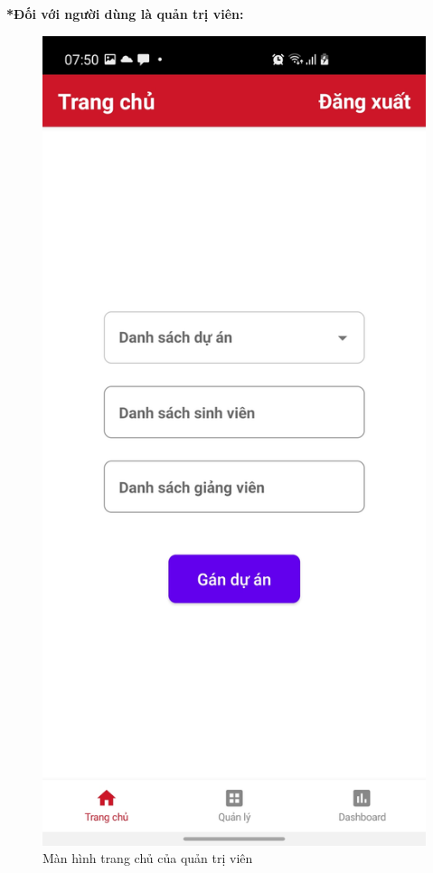 \documentclass[../Main.tex]{subfiles}
\begin{document}
\textbf{*Đối với người dùng là quản trị viên:}

\begin{figure}[H]
\begin{minipage}{0.5\textwidth}
\includegraphics[width=0.66\linewidth]{Figure/screen/screen_home_admin.jpg}
\caption{Màn hình trang chủ của quản trị viên} \label{fig:screen_login}
\end{minipage}
\hspace{\fill}
\begin{minipage}{0.5\textwidth}

\end{minipage}
\end{figure}
\end{document}
